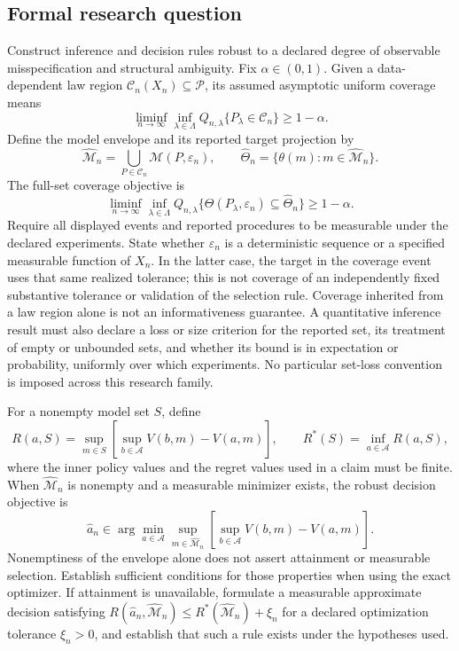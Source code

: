 \documentclass[11pt,a4paper]{article}
\begin{document}
\subsection*{Formal research question}

Construct inference and decision rules robust to a declared degree of observable misspecification and structural ambiguity. Fix $\alpha\in(0,1)$. Given a data-dependent law region $\mathcal C_n(X_n)\subseteq\mathscr P$, its assumed asymptotic uniform coverage means
\[
\liminf_{n\to\infty}\inf_{\lambda\in\Lambda}
Q_{n,\lambda}\{P_\lambda\in\mathcal C_n\}\ge1-\alpha.
\]
Define the model envelope and its reported target projection by
\[
\widehat{\mathcal M}_n=\bigcup_{P\in\mathcal C_n}\mathcal M(P,\varepsilon_n),
\qquad
\widehat\Theta_n=\{\theta(m):m\in\widehat{\mathcal M}_n\}.
\]
The full-set coverage objective is
\[
\liminf_{n\to\infty}\inf_{\lambda\in\Lambda}
Q_{n,\lambda}\{\Theta(P_\lambda,\varepsilon_n)\subseteq\widehat\Theta_n\}
\ge1-\alpha.
\]
Require all displayed events and reported procedures to be measurable under the declared experiments. State whether $\varepsilon_n$ is a deterministic sequence or a specified measurable function of $X_n$. In the latter case, the target in the coverage event uses that same realized tolerance; this is not coverage of an independently fixed substantive tolerance or validation of the selection rule. Coverage inherited from a law region alone is not an informativeness guarantee. A quantitative inference result must also declare a loss or size criterion for the reported set, its treatment of empty or unbounded sets, and whether its bound is in expectation or probability, uniformly over which experiments. No particular set-loss convention is imposed across this research family.

For a nonempty model set $S$, define
\[
R(a,S)=\sup_{m\in S}\left[\sup_{b\in\mathcal A}V(b,m)-V(a,m)\right],
\qquad R^*(S)=\inf_{a\in\mathcal A}R(a,S),
\]
where the inner policy values and the regret values used in a claim must be finite. When $\widehat{\mathcal M}_n$ is nonempty and a measurable minimizer exists, the robust decision objective is
\[
\widehat a_n\in\arg\min_{a\in\mathcal A}
\sup_{m\in\widehat{\mathcal M}_n}
\left[\sup_{b\in\mathcal A}V(b,m)-V(a,m)\right].
\]
Nonemptiness of the envelope alone does not assert attainment or measurable selection. Establish sufficient conditions for those properties when using the exact optimizer. If attainment is unavailable, formulate a measurable approximate decision satisfying $R(\widehat a_n,\widehat{\mathcal M}_n)\le R^*(\widehat{\mathcal M}_n)+\xi_n$ for a declared optimization tolerance $\xi_n>0$, and establish that such a rule exists under the hypotheses used.
\end{document}
